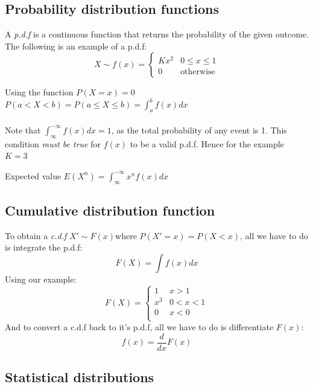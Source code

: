 \documentclass{article}
\begin{document}
\subsection{Probability distribution functions}
A \emph{p.d.f} is a continuous function that returns the probability of the given outcome. The following is an example of a p.d.f:
\[
X\sim f(x) = \begin{cases} 
Kx^2 & 0 \leq x \leq 1 \\
0 & \text{otherwise}
\end{cases}
\]
\begin{propBox}[]{Using the function}
    $P(X=x)=0$\\
    $P(a<X<b)=P(a\leq X\leq b)=\int_{a}^{b}f(x)dx$\\
    \\
    Note that $\int_{\infty}^{-\infty}f(x)dx = 1$, as the total probability of any event is 1. This condition \emph{must be true} for $f(x)$ to be a valid p.d.f. Hence for the example $K=3$
\end{propBox}
\begin{propBox}[]{Expected value}
    $E(X^n)=\int_{\infty}^{-\infty}x^nf(x)dx$
\end{propBox}
\subsection{Cumulative distribution function}
To obtain a \emph{c.d.f} $X'\sim F(x)$where $P(X'=x) = P(X < x)$, all we have to do is integrate the p.d.f: 
\[F(X)=\int f(x)dx\]
Using our example:
\[F(X)=\begin{cases}
    1 & x > 1\\
    x^3 & 0 < x < 1\\
    0 & x < 0\\
\end{cases}\]
And to convert a c.d.f back to it's p.d.f, all we have to do is differentiate $F(x)$:
\[f(x)=\frac{d}{dx}F(x)\]

\subsection{Statistical distributions}
\end{document}
